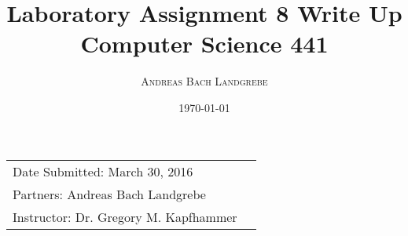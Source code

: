 \documentclass{article}
\title{Laboratory Assignment 8 Write Up \\ Computer Science 441} %
\author{\textsc{Andreas Bach Landgrebe}} %
\date{\today} %
\begin{document}
\maketitle %

\begin{center}
\begin{tabular}{l r}
Date Submitted:  March 30, 2016 \\ %
Partners:  Andreas Bach Landgrebe  \\ %
Instructor:  Dr. Gregory M. Kapfhammer  %
\end{tabular}
\end{center}


\end{document}
